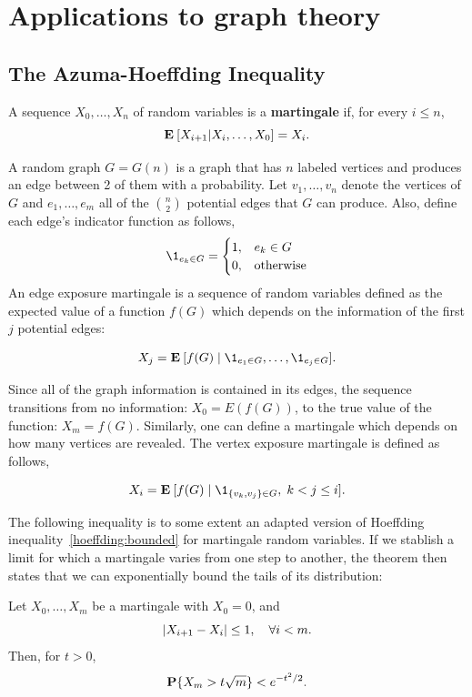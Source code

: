 \chapter{Applications to graph theory}

\section{The Azuma-Hoeffding Inequality}

\begin{definition}
    A sequence $X_0, \ldots, X_n$ of random variables is a \textbf{martingale} if, for every $i \leq n$,
    \[ \E [X_{i+1} | X_i,\ldots, X_0] = X_i. \] 
\end{definition}

A random graph $G = G(n)$ is a graph that has $n$ labeled vertices and produces an edge between 2 of them with a probability. Let $v_1, \ldots, v_n$ denote the vertices of $G$ and $e_1, \ldots, e_m$ all of the $\binom{n}{2}$ potential edges that $G$ can produce. Also, define each edge's indicator function as follows,
\[\1_{e_k \in G} = \begin{cases}
    1, & e_k \in G\\
    0, & \mbox{otherwise} 
\end{cases} \] 
An edge exposure martingale is a sequence of random variables defined as the expected value of a function $f(G)$ which depends on the information of the first $j$ potential edges:

\[ X_j = \E [f(G) \;|\; \1_{e_1 \in G}, \ldots, \1_{e_j \in G}]. \] 

Since all of the graph information is contained in its edges, the sequence transitions from no information: $X_0 = E(f(G))$, to the true value of the function: $X_m = f(G)$. Similarly, one can define a martingale which depends on how many vertices are revealed. The vertex exposure martingale is defined as follows,

\[ X_i = \E [f(G) \;|\; \1_{\{v_k, v_j\}\in G}, \; k < j \leq i] .\] 

The following inequality is to some extent an adapted version of Hoeffding inequality~\ref{hoeffding:bounded} for martingale random variables. If we stablish a limit for which a martingale varies from one step to another, the theorem then states that we can exponentially bound the tails of its distribution:

\begin{theorem}\label{azuma}
    Let $X_0, \ldots, X_m$ be a martingale with $X_0 = 0$, and
    \begin{equation}\label{azuma-condition}
        |X_{i+1} - X_i| \leq 1, \hspace*{1em} \forall i < m.
    \end{equation}
    Then, for $t > 0$,
    \[ \P\{X_m > t\sqrt{m}\} < e^{-t^2 / 2}. \] 
\end{theorem}

